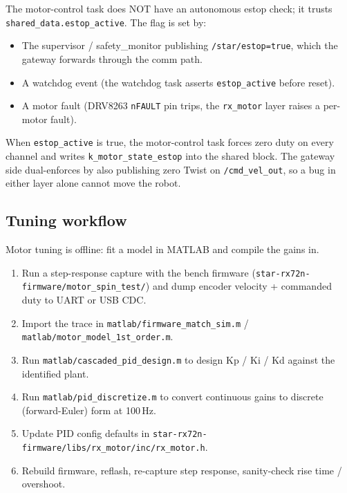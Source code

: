 The motor-control task does NOT have an autonomous estop check; it
trusts \texttt{shared\_data.estop\_active}. The flag is set by:

\begin{itemize}
  \item The supervisor / safety\_monitor publishing
        \texttt{/star/estop=true}, which the gateway forwards through
        the comm path.
  \item A watchdog event (the watchdog task asserts
        \texttt{estop\_active} before reset).
  \item A motor fault (DRV8263 \texttt{nFAULT} pin trips, the
        \texttt{rx\_motor} layer raises a per-motor fault).
\end{itemize}

When \texttt{estop\_active} is true, the motor-control task forces
zero duty on every channel and writes
\texttt{k\_motor\_state\_estop} into the shared block. The gateway
side dual-enforces by also publishing zero Twist on
\texttt{/cmd\_vel\_out}, so a bug in either layer alone cannot move
the robot.

\subsection{Tuning workflow}

Motor tuning is offline: fit a model in MATLAB and compile the gains
in.

\begin{enumerate}
  \item Run a step-response capture with the bench firmware
        (\texttt{star-rx72n-firmware/motor\_spin\_test/}) and dump
        encoder velocity + commanded duty to UART or USB CDC.
  \item Import the trace in \texttt{matlab/firmware\_match\_sim.m} /
        \texttt{matlab/motor\_model\_1st\_order.m}.
  \item Run \texttt{matlab/cascaded\_pid\_design.m} to design Kp /
        Ki / Kd against the identified plant.
  \item Run \texttt{matlab/pid\_discretize.m} to convert continuous
        gains to discrete (forward-Euler) form at 100\,Hz.
  \item Update PID config defaults in
        \texttt{star-rx72n-firmware/libs/rx\_motor/inc/rx\_motor.h}.
  \item Rebuild firmware, reflash, re-capture step response,
        sanity-check rise time / overshoot.
\end{enumerate}


